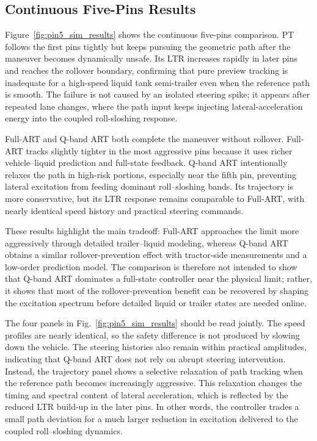 \subsection{Continuous Five-Pins Results}
Figure~\ref{fig:pin5_sim_results} shows the continuous five-pins comparison. PT follows the first pins tightly but keeps pursuing the geometric path after the maneuver becomes dynamically unsafe. Its LTR increases rapidly in later pins and reaches the rollover boundary, confirming that pure preview tracking is inadequate for a high-speed liquid tank semi-trailer even when the reference path is smooth. The failure is not caused by an isolated steering spike; it appears after repeated lane changes, where the path input keeps injecting lateral-acceleration energy into the coupled roll-sloshing response.

Full-ART and Q-band ART both complete the maneuver without rollover. Full-ART tracks slightly tighter in the most aggressive pins because it uses richer vehicle--liquid prediction and full-state feedback. Q-band ART intentionally relaxes the path in high-risk portions, especially near the fifth pin, preventing lateral excitation from feeding dominant roll--sloshing bands. Its trajectory is more conservative, but its LTR response remains comparable to Full-ART, with nearly identical speed history and practical steering commands.

These results highlight the main tradeoff: Full-ART approaches the limit more aggressively through detailed trailer--liquid modeling, whereas Q-band ART obtains a similar rollover-prevention effect with tractor-side measurements and a low-order prediction model. The comparison is therefore not intended to show that Q-band ART dominates a full-state controller near the physical limit; rather, it shows that most of the rollover-prevention benefit can be recovered by shaping the excitation spectrum before detailed liquid or trailer states are needed online.

The four panels in Fig.~\ref{fig:pin5_sim_results} should be read jointly. The speed profiles are nearly identical, so the safety difference is not produced by slowing down the vehicle. The steering histories also remain within practical amplitudes, indicating that Q-band ART does not rely on abrupt steering intervention. Instead, the trajectory panel shows a selective relaxation of path tracking when the reference path becomes increasingly aggressive. This relaxation changes the timing and spectral content of lateral acceleration, which is reflected by the reduced LTR build-up in the later pins. In other words, the controller trades a small path deviation for a much larger reduction in excitation delivered to the coupled roll--sloshing dynamics.

